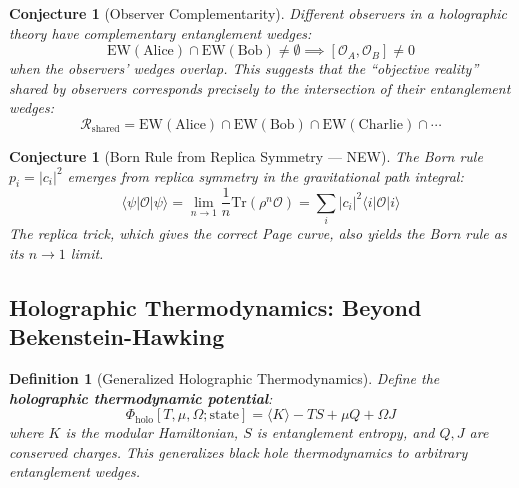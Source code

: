 \documentclass[12pt,a4paper]{article}
\newtheorem{conjecture}[theorem]{Conjecture}
\newtheorem{definition}[theorem]{Definition}
\begin{document}
\begin{conjecture}[Observer Complementarity]
Different observers in a holographic theory have complementary entanglement wedges:
\begin{equation}
\text{EW}(\text{Alice}) \cap \text{EW}(\text{Bob}) \neq \emptyset \implies [\mathcal{O}_A, \mathcal{O}_B] \neq 0
\end{equation}
when the observers' wedges overlap. This suggests that the ``objective reality'' shared by observers corresponds precisely to the intersection of their entanglement wedges:
\begin{equation}
\mathcal{R}_{\text{shared}} = \text{EW}(\text{Alice}) \cap \text{EW}(\text{Bob}) \cap \text{EW}(\text{Charlie}) \cap \cdots
\end{equation}
\end{conjecture}

\begin{conjecture}[Born Rule from Replica Symmetry --- NEW]
The Born rule $p_i = |c_i|^2$ emerges from replica symmetry in the gravitational path integral:
\begin{equation}
\langle \psi | \mathcal{O} | \psi \rangle = \lim_{n \to 1} \frac{1}{n} \text{Tr}(\rho^n \mathcal{O}) = \sum_i |c_i|^2 \langle i | \mathcal{O} | i \rangle
\end{equation}
The replica trick, which gives the correct Page curve, also yields the Born rule as its $n \to 1$ limit.
\end{conjecture}

\subsection{Holographic Thermodynamics: Beyond Bekenstein-Hawking}

\begin{definition}[Generalized Holographic Thermodynamics]
Define the \textbf{holographic thermodynamic potential}:
\begin{equation}
\Phi_{\text{holo}}[T, \mu, \Omega; \text{state}] = \langle K \rangle - T S + \mu Q + \Omega J
\end{equation}
where $K$ is the modular Hamiltonian, $S$ is entanglement entropy, and $Q, J$ are conserved charges. This generalizes black hole thermodynamics to arbitrary entanglement wedges.
\end{definition}
\end{document}

